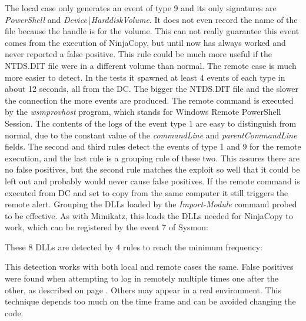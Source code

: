 \linej

\linej
The local case only generates an event of type 9 and its only signatures are \textit{PowerShell} and \textit{Device{\textbackslash}HarddiskVolume}. It does not even record the name of the file because the handle is for the volume. This can not really guarantee this event comes from the execution of NinjaCopy, but until now has always worked and never reported a false positive. This rule could be much more useful if the NTDS.DIT file were in a different volume than normal.
\linej
\linej
The remote case is much more easier to detect. In the tests it spawned at least 4 events of each type in about 12 seconds, all from the DC.
The bigger the NTDS.DIT file and the slower the connection the more events are produced.
\linej
The remote command is executed by the \textit{wsmprovhost} program, which stands for Windows Remote PowerShell Session.
The contents of the logs of the event type 1 are easy to distinguish from normal, due to the constant value of the \textit{commandLine} and \textit{parentCommandLine} fields.
\linej
The second and third rules detect the events of type 1 and 9 for the remote execution, and the last rule is a grouping rule of these two. This assures there are no false positives, but the second rule matches the exploit so well that it could be left out and probably would never cause false positives.
\linej
If the remote command is executed from DC and set to copy from the same computer it still triggers the remote alert.
\linej
\linej
Grouping the DLLs loaded by the \textit{Import-Module} command probed to be effective. As with Mimikatz, this loads the DLLs needed for NinjaCopy to work, which can be registered by the event 7 of Sysmon:

\linej
These 8 DLLs are detected by 4 rules to reach the minimum frequency:

\linej
This detection works with both local and remote cases the same.
\linej
False positives were found when attempting to log in remotely multiple times one after the other, as described on page \pageref{reverse_login}.
Others may appear in a real environment.
This technique depends too much on the time frame and can be avoided changing the code.

